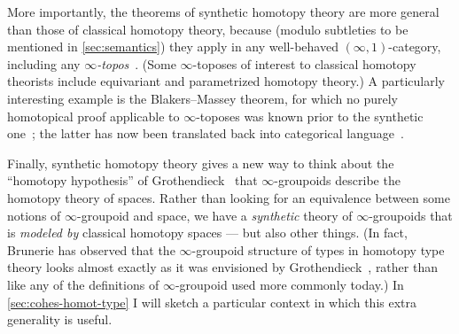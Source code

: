 \documentclass[10pt]{article}
\def\oo{\ensuremath{\infty}}
\def\io{\ensuremath{(\oo,1)}}
\numberwithin{equation}{section}
\begin{document}
More importantly, the theorems of synthetic homotopy theory are more general than those of classical homotopy theory, because (modulo subtleties to be mentioned in \cref{sec:semantics}) they apply in any well-behaved $\io$-category, %
including any \emph{$\oo$-topos}~\cite{rezk:homotopy-toposes,lurie:higher-topoi}.
(Some $\oo$-toposes of interest to classical homotopy theorists include equivariant and parametrized homotopy theory.)
A particularly interesting example is the Blakers--Massey theorem, for which no purely homotopical proof applicable to $\oo$-toposes was known prior to the synthetic one~\cite{ffll:blakers-massey}; the latter has now been translated back into categorical language~\cite{rezk:hott-blakersmassey}.

Finally, synthetic homotopy theory gives a new way to think about the ``homotopy hypothesis'' of Grothendieck~\cite{baez:homotopy-hypothesis} that $\oo$-groupoids describe the homotopy theory of spaces.
Rather than looking for an equivalence between some notions of $\oo$-groupoid and space, we have a \emph{synthetic} theory of $\oo$-groupoids that is \emph{modeled by} classical homotopy spaces --- but also other things.
(In fact, Brunerie has observed that the $\oo$-groupoid structure of types in homotopy type theory looks almost exactly as it was envisioned by Grothendieck~\cite{maltsiniotis:groth-oocat}, rather than like any of the definitions of \oo-groupoid used more commonly today.)
In \cref{sec:cohes-homot-type} I will sketch a particular context in which this extra generality is useful.
\end{document}
